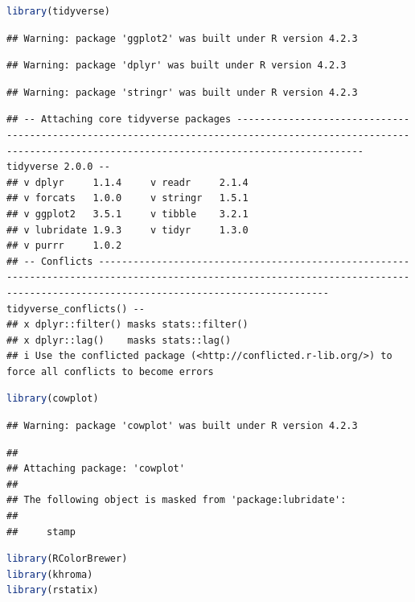 \documentclass[
]{book}
\begin{document}
\begin{lstlisting}[language=R]
library(tidyverse)
\end{lstlisting}

\begin{lstlisting}
## Warning: package 'ggplot2' was built under R version 4.2.3
\end{lstlisting}

\begin{lstlisting}
## Warning: package 'dplyr' was built under R version 4.2.3
\end{lstlisting}

\begin{lstlisting}
## Warning: package 'stringr' was built under R version 4.2.3
\end{lstlisting}

\begin{lstlisting}
## -- Attaching core tidyverse packages ------------------------------------------------------------------------------------------------------------------------------------------------------------------ tidyverse 2.0.0 --
## v dplyr     1.1.4     v readr     2.1.4
## v forcats   1.0.0     v stringr   1.5.1
## v ggplot2   3.5.1     v tibble    3.2.1
## v lubridate 1.9.3     v tidyr     1.3.0
## v purrr     1.0.2     
## -- Conflicts ------------------------------------------------------------------------------------------------------------------------------------------------------------------------------------ tidyverse_conflicts() --
## x dplyr::filter() masks stats::filter()
## x dplyr::lag()    masks stats::lag()
## i Use the conflicted package (<http://conflicted.r-lib.org/>) to force all conflicts to become errors
\end{lstlisting}

\begin{lstlisting}[language=R]
library(cowplot)
\end{lstlisting}

\begin{lstlisting}
## Warning: package 'cowplot' was built under R version 4.2.3
\end{lstlisting}

\begin{lstlisting}
## 
## Attaching package: 'cowplot'
## 
## The following object is masked from 'package:lubridate':
## 
##     stamp
\end{lstlisting}

\begin{lstlisting}[language=R]
library(RColorBrewer)
library(khroma)
library(rstatix)
\end{lstlisting}
\end{document}
